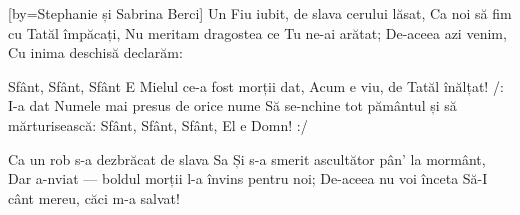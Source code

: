 [by={Stephanie și Sabrina Berci}]
\beginverse
Un Fiu iubit, de slava cerului lăsat,
Ca noi să fim cu Tatăl împăcați,
Nu meritam dragostea ce Tu ne-ai arătat;
De-aceea azi venim,
Cu inima deschisă declarăm:
\endverse

\beginchorus
Sfânt, Sfânt, Sfânt
E Mielul ce-a fost morții dat,
Acum e viu, de Tatăl înălțat!
/: I-a dat Numele mai presus de orice nume
Să se-nchine tot pământul și să mărturisească:
Sfânt, Sfânt, Sfânt, El e Domn! :/
\endchorus

\beginverse
Ca un rob s-a dezbrăcat de slava Sa
Și s-a smerit ascultător pân’ la mormânt,
Dar a-nviat — boldul morții l-a învins pentru noi;
De-aceea nu voi înceta
Să-I cânt mereu, căci m-a salvat!
\endverse
\endsong